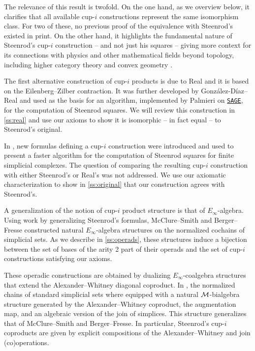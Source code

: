 The relevance of this result is twofold.
On the one hand, as we overview below, it clarifies that all available cup-$i$ constructions represent the same isomorphism class.
For two of these, no previous proof of the equivalence with Steenrod's existed in print.
On the other hand, it highlights the fundamental nature of Steenrod's \mbox{cup-$i$} construction -- and not just his squares -- giving more context for its connections with physics and other mathematical fields beyond topology, including higher category theory \cite{medina2020globular} and convex geometry \cite{medina2022fib_poly}.

The first alternative construction of \mbox{cup-$i$} products is due to Real \cite{real1996computability} and it is based on the Eilenberg--Zilber contraction.
It was further developed by Gonz\'alez-D\'iaz--Real \cite{gonzalez-diaz1999steenrod} and used as the basis for an algorithm, implemented by Palmieri on \href{https://www.sagemath.org/}{\texttt{SAGE}}, for the computation of Steenrod squares.
We will review this construction in \cref{ss:real} and use our axioms to show it is isomorphic -- in fact equal -- to Steenrod's original.

In \cite{medina2021fast_sq}, new formulas defining a \mbox{cup-$i$} construction were introduced and used to present a faster algorithm for the computation of Steenrod squares for finite simplicial complexes.
The question of comparing the resulting \mbox{cup-$i$} construction with either Steenrod's or Real's was not addressed.
We use our axiomatic characterization to show in \cref{ss:original} that our construction agrees with Steenrod's.

A generalization of the notion of \mbox{cup-$i$} product structure is that of $E_\infty$-algebra.
Using work by \cite[]{benson1998representations} generalizing Steenrod's formulas, McClure--Smith \cite{mcclure2003multivariable} and Berger--Fresse \cite{berger2004combinatorial} constructed natural $E_\infty$-algebra structures on the normalized cochains of simplicial sets.
As we describe in \cref{ss:operads}, these structures induce a bijection between the set of bases of the arity 2 part of their operads and the set of \mbox{cup-$i$} constructions satisfying our axioms.

These operadic constructions are obtained by dualizing $E_\infty$-coalgebra structures that extend the Alexander--Whitney diagonal coproduct.
In \cite{medina2020prop1}, the normalized chains of standard simplicial sets where equipped with a natural $\operatorname{\mathcal{M}}$-bialgebra structure generated by the Alexander--Whitney coproduct, the augmentation map, and an algebraic version of the join of simplices.
This structure generalizes that of McClure--Smith and Berger--Fresse.
In particular, Steenrod's \mbox{cup-$i$} coproducts are given by explicit compositions of the Alexander--Whitney and join (co)operations.

